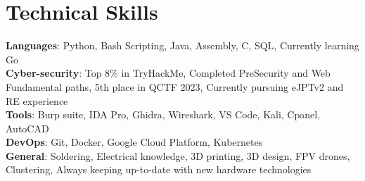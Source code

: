 \section{Technical Skills}

\begin{itemize}[leftmargin=0.15in, label={}]
    \small{\item{
        \textbf{Languages}{: Python, Bash Scripting, Java, Assembly, C, SQL, Currently learning Go} \\ \vspace{1.5mm}
        \textbf{Cyber-security}{: Top 8\% in TryHackMe, Completed PreSecurity and Web Fundamental paths, 5th place in QCTF 2023, Currently pursuing eJPTv2 and RE experience} \\ \vspace{1.5mm}
        \textbf{Tools}{: Burp suite, IDA Pro, Ghidra, Wireshark, VS Code, Kali, Cpanel, AutoCAD} \\ \vspace{1.5mm}
        \textbf{DevOps}{: Git, Docker, Google Cloud Platform, Kubernetes}\\ \vspace{1.5mm}
        \textbf{General}{: Soldering, Electrical knowledge, 3D printing, 3D design, FPV drones, Clustering, Always keeping up-to-date with new hardware technologies}\\

    }}
\end{itemize}